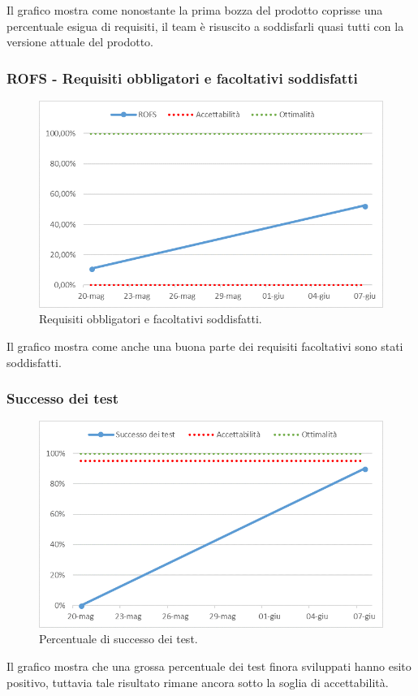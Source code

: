 Il grafico mostra come nonostante la prima bozza del prodotto coprisse una percentuale esigua di requisiti, il team è risuscito a soddisfarli quasi tutti con la versione attuale del prodotto.


\subsubsection{ROFS - Requisiti obbligatori e facoltativi soddisfatti}

\begin{figure}[h!]
	\centering
	\includegraphics[scale=0.75]{img/Grafici/ROFS.png}
	\caption{Requisiti obbligatori e facoltativi soddisfatti.}
\end{figure}

Il grafico mostra come anche una buona parte dei requisiti facoltativi sono stati soddisfatti.

\newpage

\subsubsection{Successo dei test}

\begin{figure}[h!]
	\centering
	\includegraphics[scale=0.75]{img/Grafici/successo_test.png}
	\caption{Percentuale di successo dei test.}
\end{figure}

Il grafico mostra che una grossa percentuale dei test finora sviluppati hanno esito positivo, tuttavia tale risultato rimane ancora sotto la soglia di accettabilità.



